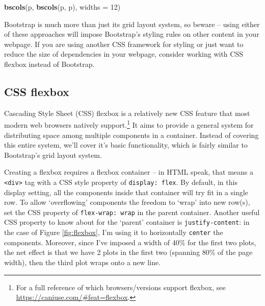 \documentclass[
  12pt,
]{krantz}
\newenvironment{Shaded}{\begin{snugshade}}{\end{snugshade}}
\newcommand{\DataTypeTok}[1]{\textcolor[rgb]{0.13,0.29,0.53}{#1}}
\newcommand{\DecValTok}[1]{\textcolor[rgb]{0.00,0.00,0.81}{#1}}
\newcommand{\KeywordTok}[1]{\textcolor[rgb]{0.13,0.29,0.53}{\textbf{#1}}}
\newcommand{\NormalTok}[1]{#1}
\begin{document}
\begin{Shaded}
\begin{Highlighting}[]
\KeywordTok{bscols}\NormalTok{(p, }\KeywordTok{bscols}\NormalTok{(p, p), }\DataTypeTok{widths =} \DecValTok{12}\NormalTok{)}
\end{Highlighting}
\end{Shaded}

Bootstrap is much more than just its grid layout system, so beware -- using either of these approaches will impose Bootstrap's styling rules on other content in your webpage. If you are using another CSS framework for styling or just want to reduce the size of dependencies in your webpage, consider working with CSS flexbox instead of Bootstrap.

\hypertarget{css-flexbox}{%
\subsection{CSS flexbox}\label{css-flexbox}}


Cascading Style Sheet (CSS) flexbox is a relatively new CSS feature that most modern web browsers natively support.\footnote{For a full reference of which browsers/versions support flexbox, see \url{https://caniuse.com/\#feat=flexbox}.} It aims to provide a general system for distributing space among multiple components in a container. Instead of covering this entire system, we'll cover it's basic functionality, which is fairly similar to Bootstrap's grid layout system.

Creating a flexbox requires a flexbox container -- in HTML speak, that means a \texttt{\textless{}div\textgreater{}} tag with a CSS style property of \texttt{display:\ flex}. By default, in this display setting, all the components inside that container will try fit in a single row. To allow `overflowing' components the freedom to `wrap' into new row(s), set the CSS property of \texttt{flex-wrap:\ wrap} in the parent container. Another useful CSS property to know about for the `parent' container is \texttt{justify-content}: in the case of Figure \ref{fig:flexbox}, I'm using it to horizontally \texttt{center} the components. Moreover, since I've imposed a width of 40\% for the first two plots, the net effect is that we have 2 plots in the first two (spanning 80\% of the page width), then the third plot wraps onto a new line.
\end{document}

